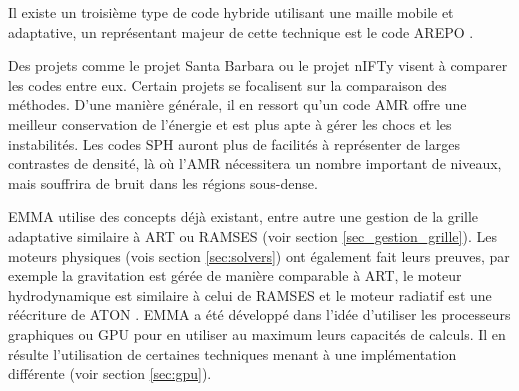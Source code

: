 Il existe un troisième type de code hybride utilisant une maille mobile et adaptative, un représentant majeur de cette technique est le code AREPO \citep{2010MNRAS.401..791S}.


Des projets comme le projet Santa Barbara \citep{1999ApJ...525..554F} ou le projet nIFTy \citep{sembolini_nifty_2015} visent à comparer les codes entre eux.
Certain projets \citep{2007MNRAS.380..963A, oshea_comparing_2005} se focalisent sur la comparaison des méthodes.
D'une manière générale, il en ressort qu'un code \ac{AMR} offre une meilleur conservation de l’énergie et est plus apte à gérer les chocs et les instabilités. %
Les codes \ac{SPH} auront plus de facilités à représenter de larges contrastes de densité, là où l'\ac{AMR} nécessitera un nombre important de niveaux, mais souffrira de bruit dans les régions sous-dense.

EMMA utilise des concepts déjà existant, entre autre une gestion de la grille adaptative similaire à ART ou RAMSES (voir section \ref{sec_gestion_grille}).
Les moteurs physiques (vois section \ref{sec:solvers}) ont également fait leurs preuves, par exemple la gravitation est gérée de manière comparable à ART, le moteur hydrodynamique est similaire à celui de RAMSES et le moteur radiatif est une réécriture de ATON \citep{aubert_radiative_2008}.
EMMA a été développé dans l'idée d'utiliser les processeurs graphiques ou \ac{GPU} pour en utiliser au maximum leurs capacités de calculs.
Il en résulte l'utilisation de certaines techniques menant à une implémentation différente (voir section \ref{sec:gpu}).


%


